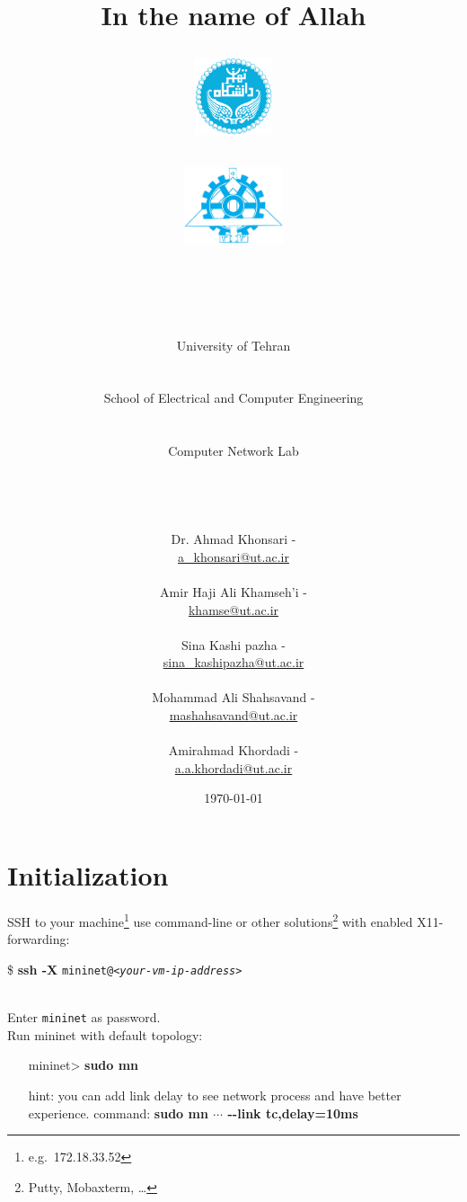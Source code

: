 \documentclass[10pt,a4paper]{article}
\title{
\normalsize In the name of Allah\\
\vspace{10pt}
\LARGE\FR{بسم \allah الرحمن الرحیم}
\vspace{10pt}
\begin{center}
	\begin{minipage}{0.48\textwidth} \begin{flushleft}
			\includegraphics[height=64pt,width=64pt]{../img/logo.png}
	\end{flushleft}\end{minipage}
	\begin{minipage}{0.48\textwidth} \begin{flushright}
			\includegraphics[height=64pt]{../img/eng-logo.png}
	\end{flushright}\end{minipage}
\end{center}
\vspace*{-64pt}
	\huge \titleText\\
\vspace{40pt}
}
\author{
	\huge University of Tehran\\
	\LARGE \FR{دانشگاه تهران}\\
	\\
	\LARGE School of Electrical and Computer Engineering\\
	\FR{دانشکده مهندسی برق و کامپیوتر}\\
	\\
	\Large Computer Network Lab\\
	\FR{آزمایشگاه شبکه‌های کامپیوتری}\\
	\\
	\\
	\\
	\normalfont
	Dr. Ahmad Khonsari - \FR{احمد خونساری}\\
	\href{mailto:a_khonsari@ut.ac.ir}{a\_khonsari@ut.ac.ir}\\
	\\
	\normalsize
	Amir Haji Ali Khamseh'i - \FR{امیر حاجی علی خمسه‌ء}\\
	\href{mailto:khamse@ut.ac.ir}{khamse@ut.ac.ir}\\
	\\
	\normalsize
	Sina Kashi pazha - \FR{سینا کاشی پزها}\\
	\href{mailto:sina\_kashipazha@ut.ac.ir}{sina\_kashipazha@ut.ac.ir}\\
	\\
	\normalsize
	Mohammad Ali Shahsavand - \FR{محمد علی شاهسوند}\\
	\href{mailto:mashahsavand@ut.ac.ir}{mashahsavand@ut.ac.ir}\\
	\\
	\normalsize
	Amirahmad Khordadi - \FR{امیر احمد خردادی}\\
	\href{mailto:a.a.khordadi@ut.ac.ir}{a.a.khordadi@ut.ac.ir}
}
\date{\vspace{30pt}\today\\\vspace{10pt}{\selectlanguage{farsi}\today}}
\numberwithin{equation}{section}
\numberwithin{figure}{section}
\numberwithin{table}{section}
\begin{document}

\maketitle


\pagebreak




\section{Initialization}
    SSH to your machine\footnote{e.g.\ 172.18.33.52} use command-line or other solutions\footnote{Putty, Mobaxterm, \ldots} with enabled X11-forwarding: \\
    \centerline{\$ \textbf{ssh -X} \texttt{mininet@\textit{<your-vm-ip-address>}}} \\
    Enter \texttt{mininet} as password.\\
    Run mininet with default topology:
    \begin{itemize}
    	\setlength{\itemindent}{30pt}
        \item [mininet>] \textbf{sudo mn}
        \item [hint:] you can add link delay to see network process and have better experience. command: \textbf{sudo mn $\cdots$ {-}{-}link tc,delay=10ms}  
    \end{itemize}
\end{document}

